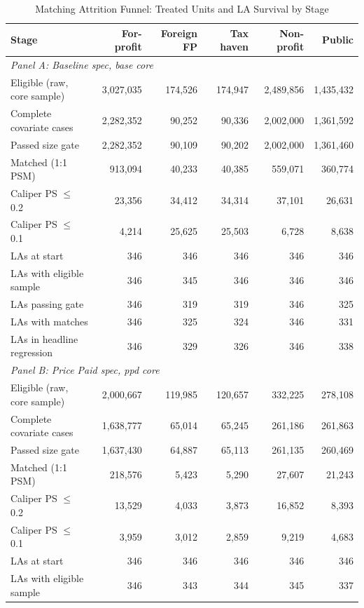 \begin{table}[htbp]
\centering
\caption{Matching Attrition Funnel: Treated Units and LA Survival by Stage}
\label{tab:attrition_funnel}
\small
\begin{tabular}{lrrrrr}
\toprule
Stage & For-profit & Foreign FP & Tax haven & Non-profit & Public \\
\midrule
\multicolumn{6}{l}{\textit{Panel A: Baseline spec, base core}} \\
Eligible (raw, core sample) & 3,027,035 & 174,526 & 174,947 & 2,489,856 & 1,435,432 \\
Complete covariate cases & 2,282,352 & 90,252 & 90,336 & 2,002,000 & 1,361,592 \\
Passed size gate & 2,282,352 & 90,109 & 90,202 & 2,002,000 & 1,361,460 \\
Matched (1:1 PSM) & 913,094 & 40,233 & 40,385 & 559,071 & 360,774 \\
Caliper PS $\leq$ 0.2 & 23,356 & 34,412 & 34,314 & 37,101 & 26,631 \\
Caliper PS $\leq$ 0.1 & 4,214 & 25,625 & 25,503 & 6,728 & 8,638 \\
\addlinespace
LAs at start & 346 & 346 & 346 & 346 & 346 \\
LAs with eligible sample & 346 & 345 & 346 & 346 & 346 \\
LAs passing gate & 346 & 319 & 319 & 346 & 325 \\
LAs with matches & 346 & 325 & 324 & 346 & 331 \\
LAs in headline regression & 346 & 329 & 326 & 346 & 338 \\
\midrule
\multicolumn{6}{l}{\textit{Panel B: Price Paid spec, ppd core}} \\
Eligible (raw, core sample) & 2,000,667 & 119,985 & 120,657 & 332,225 & 278,108 \\
Complete covariate cases & 1,638,777 & 65,014 & 65,245 & 261,186 & 261,863 \\
Passed size gate & 1,637,430 & 64,887 & 65,113 & 261,135 & 260,469 \\
Matched (1:1 PSM) & 218,576 & 5,423 & 5,290 & 27,607 & 21,243 \\
Caliper PS $\leq$ 0.2 & 13,529 & 4,033 & 3,873 & 16,852 & 8,393 \\
Caliper PS $\leq$ 0.1 & 3,959 & 3,012 & 2,859 & 9,219 & 4,683 \\
\addlinespace
LAs at start & 346 & 346 & 346 & 346 & 346 \\
LAs with eligible sample & 346 & 343 & 344 & 345 & 337 \\

\end{tabular}
\end{table}
